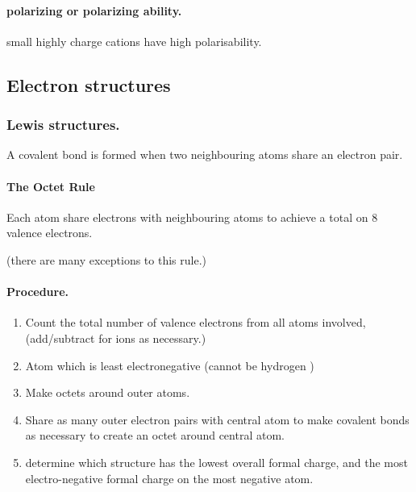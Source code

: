 \documentclass[]{article}
\providecommand{\tightlist}{%
  \setlength{\itemsep}{0pt}\setlength{\parskip}{0pt}}
\let\oldparagraph\paragraph
\renewcommand{\paragraph}[1]{\oldparagraph{#1}\mbox{}}
\begin{document}
\paragraph{polarizing or polarizing
ability.}\label{polarizing-or-polarizing-ability.}

small highly charge cations have high polarisability.

\subsection{Electron structures}\label{electron-structures}

\subsubsection{Lewis structures.}\label{lewis-structures.}

A covalent bond is formed when two neighbouring atoms share an electron
pair.

\paragraph{The Octet Rule}\label{the-octet-rule}

Each atom share electrons with neighbouring atoms to achieve a total on
8 valence electrons.

(there are many exceptions to this rule.)

\paragraph{Procedure.}\label{procedure.}

\begin{enumerate}
\def\labelenumi{\arabic{enumi}.}
\tightlist
\item
  Count the total number of valence electrons from all atoms involved,
  (add/subtract for ions as necessary.)
\item
  Atom which is least electronegative (cannot be hydrogen )
\item
  Make octets around outer atoms.
\item
  Share as many outer electron pairs with central atom to make covalent
  bonds as necessary to create an octet around central atom.
\item
  determine which structure has the lowest overall formal charge, and
  the most electro-negative formal charge on the most negative atom.
\end{enumerate}
\end{document}
